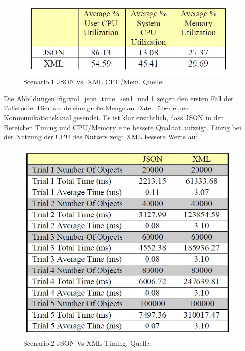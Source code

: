 \documentclass[a4paper]{article}
\begin{document}
	\begin{figure}[H] 
		\includegraphics[width=\linewidth]{../Bilder/xml_json_mem_sen1.jpg}
		\caption{Scenario 1 JSON vs. XML CPU/Mem. Quelle: \cite{XmlJson}}
		\label{fig:xml_json_mem_sen1}
	\end{figure}
	
	\newpage
	
	Die Abbildungen \ref{fig:xml_json_time_sen1} und \ref{fig:xml_json_mem_sen1}
	zeigen den ersten Fall der Fallstudie. Hier wurde eine große Menge an Daten
	über einen Kommunikationskanal gesendet. Es ist klar ersichtlich, dass JSON
	in den Bereichen Timing und CPU/Memory eine bessere Qualität aufzeigt. Einzig
	bei der Nutzung der CPU des Nutzers zeigt XML bessere Werte auf.
	
	\begin{figure}[H] 
		\centerline{
			\includegraphics[scale=0.8]{../Bilder/xml_json_time_sen2.jpg}
		}
		\caption{Scenario 2 JSON Vs XML Timing. Quelle: \cite{XmlJson}}
		\label{fig:xml_json_time_sen2}
	\end{figure}
	
\end{document}
